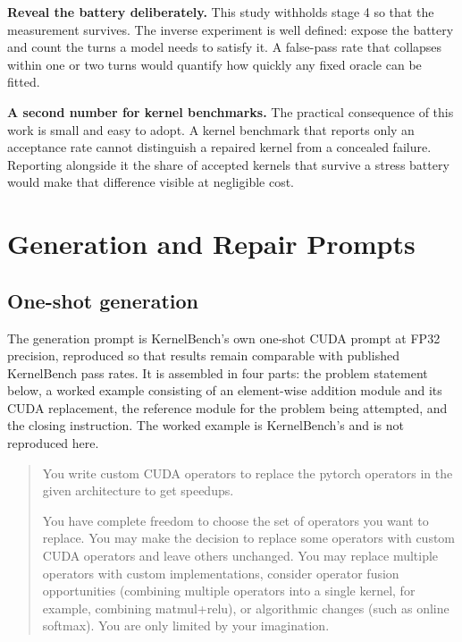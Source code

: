 \documentclass[12pt]{article}
\begin{document}
\textbf{Reveal the battery deliberately.} This study withholds stage 4 so that
the measurement survives. The inverse experiment is well defined: expose the
battery and count the turns a model needs to satisfy it. A false-pass rate that
collapses within one or two turns would quantify how quickly any fixed oracle
can be fitted.

\textbf{A second number for kernel benchmarks.} The practical consequence of
this work is small and easy to adopt. A kernel benchmark that reports only an
acceptance rate cannot distinguish a repaired kernel from a concealed failure.
Reporting alongside it the share of accepted kernels that survive a stress
battery would make that difference visible at negligible cost.




\newpage
\appendix

\section{Generation and Repair Prompts}
\label{app:prompts}

\subsection*{One-shot generation}

The generation prompt is KernelBench's own one-shot CUDA prompt at FP32
precision, reproduced so that results remain comparable with published
KernelBench pass rates. It is assembled in four parts: the problem statement
below, a worked example consisting of an element-wise addition module and its
CUDA replacement, the reference module for the problem being attempted, and the
closing instruction. The worked example is KernelBench's and is not reproduced
here.

\begin{quote}\small
You write custom CUDA operators to replace the pytorch operators in the given
architecture to get speedups.

You have complete freedom to choose the set of operators you want to replace.
You may make the decision to replace some operators with custom CUDA operators
and leave others unchanged. You may replace multiple operators with custom
implementations, consider operator fusion opportunities (combining multiple
operators into a single kernel, for example, combining matmul+relu), or
algorithmic changes (such as online softmax). You are only limited by your
imagination.
\end{quote}
\end{document}
